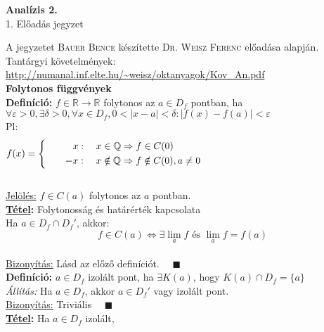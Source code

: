 \documentclass[a4paper,11pt]{article}
\begin{document}
\def\biz{\normalsize{\textbf{\underline{Bizonyítás:} }\hspace*{0.3cm}}}
\def\tetel{\large \textbf{Tétel: }}
\def\defi{\normalsize \textbf{Definíció: }}
\def\Z{\mathbb{Z}}
\def\R{\mathbb{R}}
\def\N{\mathbb{N}}
\def\Q{\mathbb{Q}}
\def\sumn{\displaystyle\sum_{n=0}^{\infty}}
\def\biz{\normalsize{\underline{Bizonyítás:} }\hspace*{0.5cm}}
\def\tetel{\normalsize \textbf{\underline{Tétel}: }}
\def\bizva{\quad\blacksquare}
\begin{center}
	{\LARGE\textbf{Analízis 2.}}\\[0.2cm]
	
	{\Large 1. Előadás jegyzet}\\[1cm]	
\end{center}
{\small A jegyzetet \textsc{Bauer Bence} készítette \textsc{Dr. Weisz Ferenc} előadása alapján.}\\[0.2cm]
Tantárgyi követelmények: \url{http://numanal.inf.elte.hu/~weisz/oktanyagok/Kov_An.pdf}\\[0.2cm]
\textbf{{\large Folytonos függvények}}\\[0.1cm]
\defi $f\in\R\to\R$ folytonos az $a\in D_f$ pontban, ha\\[0.2cm]
$\forall\varepsilon>0,\exists\delta>0,\forall x\in D_f,0<|x-a|<\delta:
|f(x)-f(a)|<\varepsilon$\\[0.1cm] Pl: \[\displaystyle f(x) = 
\left\{
\begin{gathered}
x: \quad x\in\Q\Rightarrow f\in C(0)\hspace{5.7cm} \\
\quad\quad-x: \quad x\notin\Q\Rightarrow f\notin C(0), a\neq 0\hspace{5.7cm}
\end{gathered}\right. \]\\[0.1cm]
\underline{Jelölés:}  $f\in C(a)$ folytonos az $a$ pontban.\\[0.2cm]
\tetel Folytonosság és határérték kapcsolata\\[0.1cm]
Ha $a\in D_f\cap D_f'$, akkor: \[ f\in C(a)\Leftrightarrow \exists\lim_a f \text{ és } \lim_a f=f(a)\]\\[0.1cm]
\biz Lásd az előző definíciót. $\quad\blacksquare$\\[0.3cm]
\defi $a\in D_f$ izolált pont, ha $\exists K(a)$, hogy $K(a)\cap D_f=\{a\}$
\\[0.1cm] \textit{Állítás:} Ha $a\in D_f$, akkor $a\in D_f'$ vagy izolált pont.
\\[0.1cm]\biz Triviális $\quad\blacksquare$\\[0.2cm] \tetel Ha $a\in D_f$ izolált, 
\end{document}
